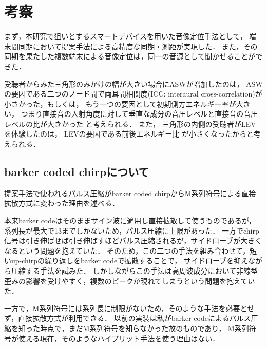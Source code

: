 \chapter{考察}
\begin{comment}
既知の問題としては，Nexus7が録音中に頻繁にバッファを取りこぼすことが挙げられる．


この現象によりパルスが到来した時刻が分からないので，上記手法が使えなかった．
原因はハードウェアにあるのかOSにあるのかブラウザの実装にあるのか不明であり，現在調査中である．
MacBookAirとMacBookPro間では同期に成功している．



他には，TDMAのみではN回の排他的パルス送信が必要で同期に時間がかかるという問題がある．
これにはスペクトル拡散を使っているのでCDMA（Code Division Multiple Access)化できる余地があるが，
今までの実験で，Nexus7ではGold符号でBPSKした信号が重なったときに，
分離検出できないという問題があったため，開発は滞っている．

\end{comment}

まず，本研究で狙いとするスマートデバイスを用いた音像定位手法として，
端末間同期において提案手法による高精度な同期・測距が実現した．
また，その同期を果たした複数端末による音像定位は，同一の音源として聞かせることができた．

受聴者からみた三角形のみかけの幅が大きい場合にASWが増加したのは，
ASWの要因である二つのノード間で両耳間相関度(ICC: interaural cross-correlation)が
小さかった\cite{morimoto95}，もしくは，
もう一つの要因として初期側方エネルギー率が大きい，
つまり直接音の入射角度に対して垂直な成分の音圧レベルと直接音の音圧レベルの比が大きかった\cite{barron81}
と考えられる．
また，
三角形の内側の受聴者がLEVを体験したのは，
LEVの要因である前後エネルギー比\cite{suehiro06}
が小さくなったからと考えられる．


\section{barker coded chirpについて}
提案手法で使われるパルス圧縮がbarker coded chirpからM系列符号による直接拡散方式に変わった理由を述べる．

本来barker codeはそのままサイン波に適用し直接拡散して使うものであるが，
系列長が最大で13までしかないため，パルス圧縮に上限があった．
一方でchirp信号は引き伸ばせば引き伸ばすほどパルス圧縮されるが，サイドローブが大きくなるという問題を抱えていた．
そのため，この二つの手法を組み合わせて，短いup-chirpの繰り返しをbarker codeで拡散することで，
サイドローブを抑えながら圧縮する手法を試みた．
しかしながらこの手法は高周波成分において非線型歪みの影響を受けやすく，複数のピークが現れてしまうという問題を抱えていた．

一方で，M系列符号には系列長に制限がないため，そのような手法を必要とせず，直接拡散方式が利用できる．
以前の実装は私がbarker codeによるパルス圧縮を知った時点で，まだM系列符号を知らなかった故のものであり，
M系列符号が使える現在，そのようなハイブリット手法を使う理由はない．
